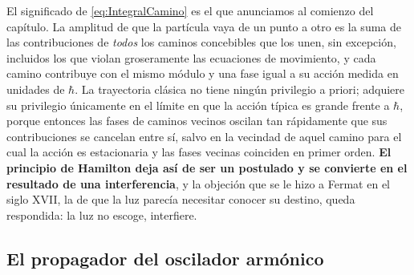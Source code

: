         El significado de \eqref{eq:IntegralCamino} es el que anunciamos al comienzo del capítulo. La amplitud de que la partícula vaya de un punto a otro es la suma de las contribuciones de \textit{todos} los caminos concebibles que los unen, sin excepción, incluidos los que violan groseramente las ecuaciones de movimiento, y cada camino contribuye con el mismo módulo y una fase igual a su acción medida en unidades de $\hbar$. La trayectoria clásica no tiene ningún privilegio a priori; adquiere su privilegio únicamente en el límite en que la acción típica es grande frente a $\hbar$, porque entonces las fases de caminos vecinos oscilan tan rápidamente que sus contribuciones se cancelan entre sí, salvo en la vecindad de aquel camino para el cual la acción es estacionaria y las fases vecinas coinciden en primer orden. \textbf{El principio de Hamilton deja así de ser un postulado y se convierte en el resultado de una interferencia}, y la objeción que se le hizo a Fermat en el siglo XVII, la de que la luz parecía necesitar conocer su destino, queda respondida: la luz no escoge, interfiere.

    \subsection{El propagador del oscilador armónico}

